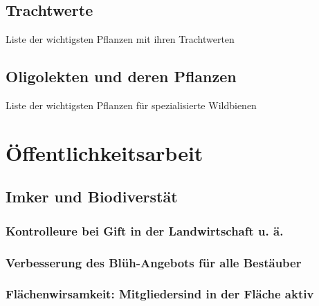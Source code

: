 \documentclass[
]{book}
\begin{document}
\hypertarget{trachtwerte}{%
\section{Trachtwerte}\label{trachtwerte}}

Liste der wichtigsten Pflanzen mit ihren Trachtwerten

\hypertarget{oligolekten-und-deren-pflanzen}{%
\section{Oligolekten und deren Pflanzen}\label{oligolekten-und-deren-pflanzen}}

Liste der wichtigsten Pflanzen für spezialisierte Wildbienen

\hypertarget{uxf6ffentlichkeitsarbeit}{%
\chapter{Öffentlichkeitsarbeit}\label{uxf6ffentlichkeitsarbeit}}

\hypertarget{imker-und-biodiverstuxe4t}{%
\section{Imker und Biodiverstät}\label{imker-und-biodiverstuxe4t}}

\hypertarget{kontrolleure-bei-gift-in-der-landwirtschaft-u.-uxe4.}{%
\subsection{Kontrolleure bei Gift in der Landwirtschaft u. ä.}\label{kontrolleure-bei-gift-in-der-landwirtschaft-u.-uxe4.}}

\hypertarget{verbesserung-des-bluxfch-angebots-fuxfcr-alle-bestuxe4uber}{%
\subsection{Verbesserung des Blüh-Angebots für alle Bestäuber}\label{verbesserung-des-bluxfch-angebots-fuxfcr-alle-bestuxe4uber}}

\hypertarget{fluxe4chenwirsamkeit-mitgliedersind-in-der-fluxe4che-aktiv}{%
\subsection{Flächenwirsamkeit: Mitgliedersind in der Fläche aktiv}\label{fluxe4chenwirsamkeit-mitgliedersind-in-der-fluxe4che-aktiv}}
\end{document}
